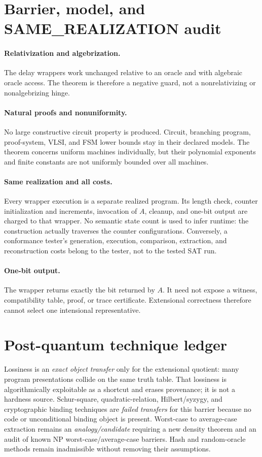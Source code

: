 \documentclass[11pt]{article}
\begin{document}
\section*{Barrier, model, and SAME\_REALIZATION audit}
\paragraph{Relativization and algebrization.}
The delay wrappers work unchanged relative to an oracle and with algebraic
oracle access.  The theorem is therefore a negative guard, not a
nonrelativizing or nonalgebrizing hinge.

\paragraph{Natural proofs and nonuniformity.}
No large constructive circuit property is produced.  Circuit, branching
program, proof-system, VLSI, and FSM lower bounds stay in their declared
models.  The theorem concerns uniform machines individually, but their
polynomial exponents and finite constants are not uniformly bounded over all
machines.

\paragraph{Same realization and all costs.}
Every wrapper execution is a separate realized program.  Its length check,
counter initialization and increments, invocation of \(A\), cleanup, and
one-bit output are charged to that wrapper.  No semantic state count is used to
infer runtime: the construction actually traverses the counter
configurations.  Conversely, a conformance tester's generation, execution,
comparison, extraction, and reconstruction costs belong to the tester, not to
the tested SAT run.

\paragraph{One-bit output.}
The wrapper returns exactly the bit returned by \(A\).  It need not expose a
witness, compatibility table, proof, or trace certificate.  Extensional
correctness therefore cannot select one intensional representative.

\section*{Post-quantum technique ledger}
Lossiness is an \emph{exact object transfer} only for the extensional quotient:
many program presentations collide on the same truth table.  That lossiness is
algorithmically exploitable as a shortcut and erases provenance; it is not a
hardness source.  Schur-square, quadratic-relation, Hilbert/syzygy, and
cryptographic binding techniques are \emph{failed transfers} for this barrier
because no code or unconditional binding object is present.  Worst-case to
average-case extraction remains an \emph{analogy/candidate} requiring a new
density theorem and an audit of known NP worst-case/average-case barriers.
Hash and random-oracle methods remain inadmissible without removing their
assumptions.
\end{document}
